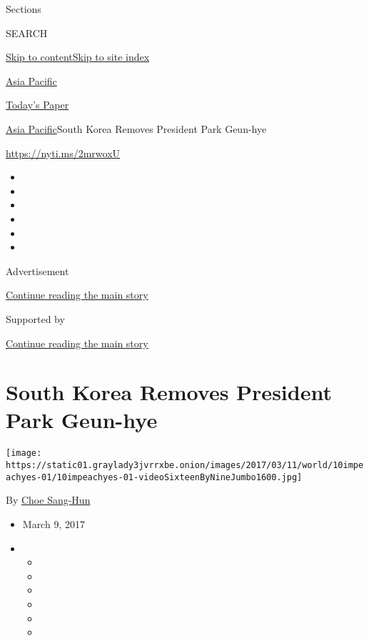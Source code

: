 Sections

SEARCH

\protect\hyperlink{site-content}{Skip to
content}\protect\hyperlink{site-index}{Skip to site index}

\href{https://www.nytimes3xbfgragh.onion/section/world/asia}{Asia
Pacific}

\href{https://myaccount.nytimes3xbfgragh.onion/auth/login?response_type=cookie\&client_id=vi}{}

\href{https://www.nytimes3xbfgragh.onion/section/todayspaper}{Today's
Paper}

\href{/section/world/asia}{Asia Pacific}\textbar{}South Korea Removes
President Park Geun-hye

\url{https://nyti.ms/2mrwoxU}

\begin{itemize}
\item
\item
\item
\item
\item
\item
\end{itemize}

Advertisement

\protect\hyperlink{after-top}{Continue reading the main story}

Supported by

\protect\hyperlink{after-sponsor}{Continue reading the main story}

\hypertarget{south-korea-removes-president-park-geun-hye}{%
\section{South Korea Removes President Park
Geun-hye}\label{south-korea-removes-president-park-geun-hye}}

\texttt{[image: https://static01.graylady3jvrrxbe.onion/images/2017/03/11/world/10impeachyes-01/10impeachyes-01-videoSixteenByNineJumbo1600.jpg]}

By \href{http://www.nytimes3xbfgragh.onion/by/choe-sang-hun}{Choe
Sang-Hun}

\begin{itemize}
\item
  March 9, 2017
\item
  \begin{itemize}
  \item
  \item
  \item
  \item
  \item
  \item
  \end{itemize}
\end{itemize}


